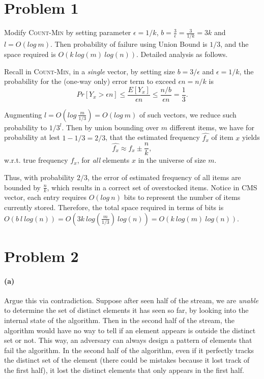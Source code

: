 \documentclass[12pt]{article}
\begin{document}
	
\section*{Problem 1}

Modify \textsc{Count-Min} by setting parameter $\epsilon=1/k$, $b = \frac{3}{\epsilon} = \frac{3}{1/k} = 3k$ and $l = O(log\: m)$. Then probability of failure using Union Bound is $1/3$, and the space required is $O(k\:log(m)\:log(n))$. Detailed analysis as follows.

Recall in \textsc{Count-Min}, in a \emph{single} vector, by setting size $b = 3/\epsilon$ and $\epsilon = 1/k$, the probability for the (one-way only) error term to exceed $\epsilon n = n/k$ is 
\begin{equation*}
Pr[Y_x > \epsilon n] \leq \frac{E[Y_x]}{\epsilon n} \leq \frac{n/b}{\epsilon n} = \frac{1}{3}.
\end{equation*}

Augmenting $l = O(log\:\frac{m}{1/3}) = O(log\:m)$ of such vectors, we reduce such probability to $1/3^l$. Then by union bounding over $m$ different items, we have for probability at lest $1-1/3=2/3$, that the estimated frequency $\hat{f_x}$ of item $x$ yields
\begin{equation*}
\hat{f_x} \approx f_x \pm \frac{n}{k},
\end{equation*}
w.r.t. true frequency $f_x$, for \emph{all} elements $x$ in the universe of size $m$.

Thus, with probability $2/3$, the error of estimated frequency of all items are bounded by $\frac{n}{k}$, which results in a correct set of overstocked items. Notice in \textsc{CMS} vector, each entry requires $O(log\:n)$ bits to represent the number of items currently stored. Therefore, the total space required in terms of bits is $O(b\:l\:log(n)) = O(3k\:log(\frac{m}{1/3})\:log(n)) = O(k\:log(m)\:log(n))$.

\pagebreak

\section*{Problem 2}
\paragraph{(a)}
Argue this via contradiction. Suppose after seen half of the stream, we are \emph{unable} to determine the set of distinct elements it has seen so far, by looking into the internal state of the algorithm. Then in the second half of the stream, the algorithm would have no way to tell if an element appears is outside the distinct set or not. This way, an adversary can always design a pattern of elements that fail the algorithm. In the second half of the algorithm, even if it perfectly tracks the distinct set of the element (there could be mistakes because it lost track of the first half), it lost the distinct elements that only appears in the first half. 
\end{document}
